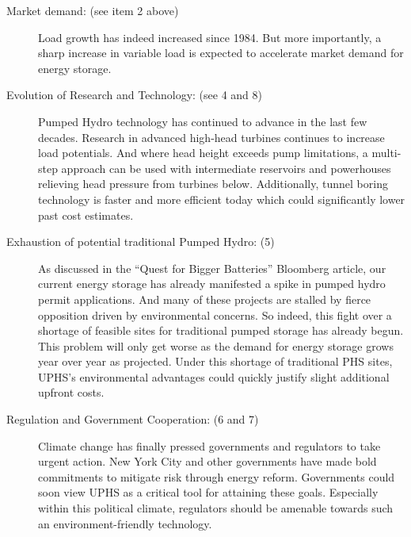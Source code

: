 \documentclass[hidelinks,12pt,a4paper]{article}
\begin{document}
{\footnotesize
\begin{description}
    \item[Market demand: (see item 2 above)] Load growth has indeed increased since 1984. \cite{CenterForSustainableSystemsUniversityOfMichigan} But more importantly, a sharp increase in variable load is expected to accelerate market demand for energy storage.

    \item[Evolution of Research and Technology: (see 4 and 8)] Pumped Hydro technology has continued to advance in the last few decades. Research in advanced high-head turbines continues to increase load potentials. \cite{ParametricDesignOfAnUltrahighHeadPumpTurbine, 700m400MWClassUltrahighheadPumpTurbine} And where head height exceeds pump limitations, a multi-step approach can be used with intermediate reservoirs and powerhouses relieving head pressure from turbines below. \cite{SubSurfacePumpedHydroelectricStorage} Additionally, tunnel boring technology is faster and more efficient today which could significantly lower past cost estimates. \cite{VerticalConveyorsTheRobbinsCompany, TheBoringCompanyShowsOffItsFunctionalDemo}


    \item[Exhaustion of potential traditional Pumped Hydro: (5)] As discussed in the “Quest for Bigger Batteries” Bloomberg article, our current energy storage has already manifested a spike in pumped hydro permit applications. And many of these projects are stalled by fierce opposition driven by environmental concerns. So indeed, this fight over a shortage of feasible sites for traditional pumped storage has already begun. This problem will only get worse as the demand for energy storage grows year over year as projected. Under this shortage of traditional PHS sites, UPHS's environmental advantages could quickly justify slight additional upfront costs.

    \item[Regulation and Government Cooperation: (6 and 7)] Climate change has finally pressed governments and regulators to take urgent action. New York City and other governments have made bold commitments to mitigate risk through energy reform. Governments could soon view UPHS as a critical tool for attaining these goals. Especially within this political climate, regulators should be amenable towards such an environment-friendly technology.


\end{description}}
\end{document}
